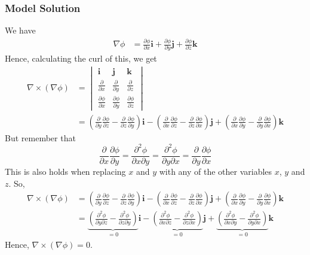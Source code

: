 \documentclass[a4paper,10pt]{article}
\begin{document}
\subsubsection{Model Solution}
We have \begin{align*} \nabla\phi &= \frac{\partial \phi}{\partial x}\mathbf i + \frac{\partial \phi}{\partial y}\mathbf j + \frac{\partial \phi}{\partial z}\mathbf k \end{align*} Hence, calculating the curl of this, we get \begin{align*} \nabla \times \left( \nabla \phi \right) &= \begin{vmatrix} \mathbf{i} & \mathbf{j} & \mathbf{k} \\ \frac{\partial }{\partial x} & \frac{\partial}{\partial y} & \frac{\partial}{\partial z} \\ \frac{\partial \phi}{\partial x} & \frac{\partial \phi}{\partial y} & \frac{\partial \phi}{\partial z} \end{vmatrix} \\ &= \left( \frac{\partial}{\partial y}\frac{\partial \phi}{\partial z} - \frac{\partial}{\partial z}\frac{\partial \phi}{\partial y} \right) \textbf{i} - \left( \frac{\partial}{\partial x}\frac{\partial \phi}{\partial z} - \frac{\partial}{\partial z}\frac{\partial \phi}{\partial x} \right) \textbf{j} + \left( \frac{\partial}{\partial x}\frac{\partial \phi}{\partial y} - \frac{\partial}{\partial y}\frac{\partial \phi}{\partial x} \right) \textbf{k} \end{align*} But remember that \[ \frac{\partial}{\partial x}\frac{\partial \phi}{\partial y} = \frac{\partial^2 \phi}{\partial x \partial y} = \frac{\partial^2 \phi}{\partial y \partial x} = \frac{\partial}{\partial y}\frac{\partial \phi}{\partial x} \] This is also holds when replacing $x$ and $y$ with any of the other variables $x$, $y$ and $z$. So, \begin{align*} \nabla \times \left( \nabla \phi \right) &= \left( \frac{\partial}{\partial y}\frac{\partial \phi}{\partial z} - \frac{\partial}{\partial z}\frac{\partial \phi}{\partial y} \right) \textbf{i} - \left( \frac{\partial}{\partial x}\frac{\partial \phi}{\partial z} - \frac{\partial}{\partial z}\frac{\partial \phi}{\partial x} \right) \textbf{j} + \left( \frac{\partial}{\partial x}\frac{\partial \phi}{\partial y} - \frac{\partial}{\partial y}\frac{\partial \phi}{\partial x} \right) \textbf{k} \\ &= \underbrace{\left( \frac{\partial^2 \phi}{\partial y \partial z}- \frac{\partial^2 \phi}{\partial z \partial y} \right)}_{=0} \textbf{i} - \underbrace{\left( \frac{\partial^2 \phi}{\partial x \partial z} - \frac{\partial^2 \phi}{\partial z \partial x} \right)}_{=0} \textbf{j} + \underbrace{\left(\frac{\partial^2 \phi}{\partial x \partial y} - \frac{\partial^2 \phi}{\partial y \partial x} \right)}_{=0} \textbf{k} \end{align*} Hence, $\nabla \times \left( \nabla \phi \right) = 0$.
\end{document}
